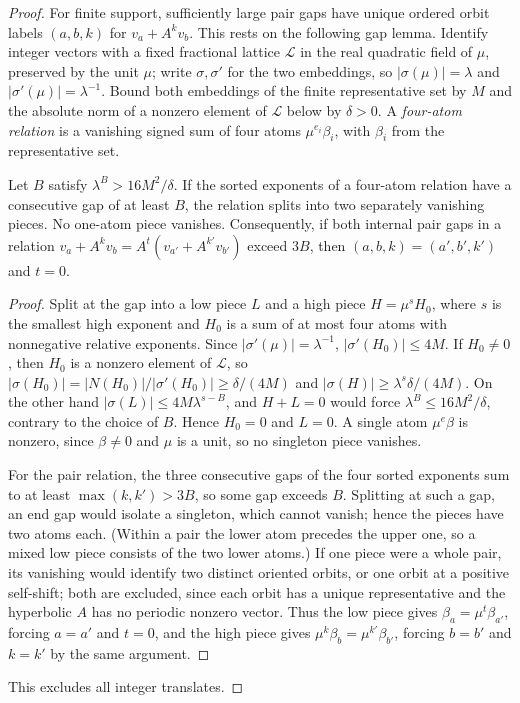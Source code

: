 \begin{proof}
For finite support, sufficiently large pair gaps have unique ordered orbit
labels $(a,b,k)$ for $v_a+A^kv_b$. This rests on the following gap lemma.
Identify integer vectors with a fixed fractional lattice $\mathcal L$ in
the real quadratic field of $\mu$, preserved by the unit $\mu$; write
$\sigma,\sigma'$ for the two embeddings, so $|\sigma(\mu)|=\lambda$ and
$|\sigma'(\mu)|=\lambda^{-1}$. Bound both embeddings of the finite
representative set by $M$ and the absolute norm of a nonzero element of
$\mathcal L$ below by $\delta>0$. A \emph{four-atom relation} is a
vanishing signed sum of four atoms $\mu^{e_i}\beta_i$, with $\beta_i$ from
the representative set.

\begin{lemma}\label{lem:four-atom-gap}
Let $B$ satisfy $\lambda^B>16M^2/\delta$. If the sorted exponents of a
four-atom relation have a consecutive gap of at least $B$, the relation
splits into two separately vanishing pieces. No one-atom piece vanishes.
Consequently, if both internal pair gaps in a relation
$v_a+A^kv_b=A^t(v_{a'}+A^{k'}v_{b'})$ exceed $3B$, then
$(a,b,k)=(a',b',k')$ and $t=0$.
\end{lemma}
\begin{proof}
Split at the gap into a low piece $L$ and a high piece $H=\mu^sH_0$, where
$s$ is the smallest high exponent and $H_0$ is a sum of at most four atoms
with nonnegative relative exponents. Since $|\sigma'(\mu)|=\lambda^{-1}$,
$|\sigma'(H_0)|\le4M$. If $H_0\ne0$, then $H_0$ is a nonzero element of
$\mathcal L$, so
$|\sigma(H_0)|=|N(H_0)|/|\sigma'(H_0)|\ge\delta/(4M)$ and
$|\sigma(H)|\ge\lambda^s\delta/(4M)$. On the other hand
$|\sigma(L)|\le4M\lambda^{s-B}$, and $H+L=0$ would force
$\lambda^B\le16M^2/\delta$, contrary to the choice of $B$. Hence $H_0=0$
and $L=0$. A single atom $\mu^e\beta$ is nonzero, since $\beta\ne0$ and
$\mu$ is a unit, so no singleton piece vanishes.

For the pair relation, the three consecutive gaps of the four sorted
exponents sum to at least $\max(k,k')>3B$, so some gap exceeds $B$.
Splitting at such a gap, an end gap would isolate a singleton, which
cannot vanish; hence the pieces have two atoms each. (Within a pair the
lower atom precedes the upper one, so a mixed low piece consists of the
two lower atoms.) If one piece were a whole pair, its vanishing would
identify two distinct oriented orbits, or one orbit at a positive
self-shift; both are excluded, since each orbit has a unique
representative and the hyperbolic $A$ has no periodic nonzero vector.
Thus the low piece gives $\beta_a=\mu^t\beta_{a'}$, forcing $a=a'$ and
$t=0$, and the high piece gives $\mu^k\beta_b=\mu^{k'}\beta_{b'}$,
forcing $b=b'$ and $k=k'$ by the same argument.
\end{proof}
This excludes all integer translates.


\end{proof}
